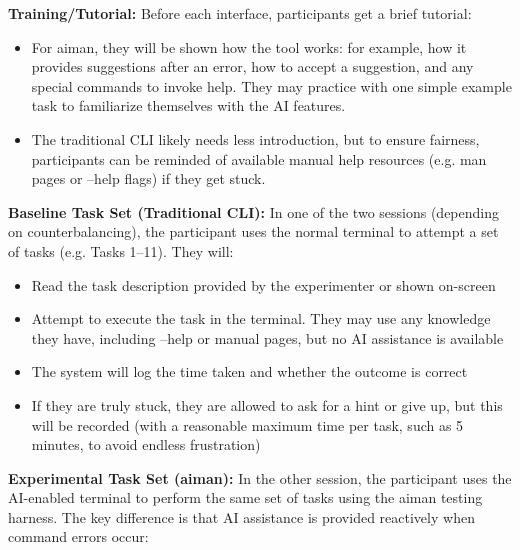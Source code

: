 \textbf{Training/Tutorial:} Before each interface, participants get a brief tutorial:
\begin{itemize}
	\item For aiman, they will be shown how the tool works: for example, how it provides suggestions after an error, how to accept a suggestion, and any special commands to invoke help. They may practice with one simple example task to familiarize themselves with the AI features.
	\item The traditional CLI likely needs less introduction, but to ensure fairness, participants can be reminded of available manual help resources (e.g. man pages or --help flags) if they get stuck.
\end{itemize}

\textbf{Baseline Task Set (Traditional CLI):} In one of the two sessions (depending on counterbalancing), the participant uses the normal terminal to attempt a set of tasks (e.g. Tasks 1–11). They will:
\begin{itemize}
	\item Read the task description provided by the experimenter or shown on-screen
	\item Attempt to execute the task in the terminal. They may use any knowledge they have, including --help or manual pages, but no AI assistance is available
	\item The system will log the time taken and whether the outcome is correct
	\item If they are truly stuck, they are allowed to ask for a hint or give up, but this will be recorded (with a reasonable maximum time per task, such as 5 minutes, to avoid endless frustration)
\end{itemize}

\textbf{Experimental Task Set (aiman):} In the other session, the participant uses the AI-enabled terminal to perform the same set of tasks using the aiman testing harness. The key difference is that AI assistance is provided reactively when command errors occur:

